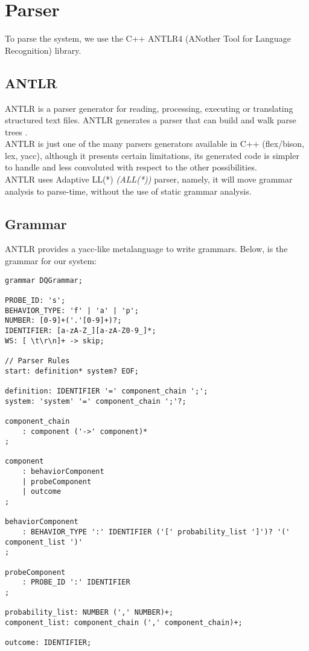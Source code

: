 \section{Parser}
        To parse the system, we use the C++ ANTLR4 (ANother Tool for Language Recognition) library. 
        \subsection{ANTLR}
    ANTLR is a parser generator for reading, processing, executing or translating structured text files. ANTLR generates a parser that can build and walk parse trees \cite{antlr4}. \\
 ANTLR is just one of the many parsers generators available in C++ (flex/bison, lex, yacc), although it presents certain limitations, its generated code is simpler to handle and less convoluted with respect to the other possibilities. \\
        ANTLR uses Adaptive LL(*) \textit{(ALL(*))} parser, namely, it will move grammar analysis to parse-time, without the use of static grammar analysis. \cite{antlr}

        \subsection{Grammar}
            ANTLR provides a yacc-like metalanguage \cite{antlr} to write grammars. Below, is the grammar for our system:
            \begin{verbatim} 
grammar DQGrammar;

PROBE_ID: 's';
BEHAVIOR_TYPE: 'f' | 'a' | 'p';
NUMBER: [0-9]+('.'[0-9]+)?;
IDENTIFIER: [a-zA-Z_][a-zA-Z0-9_]*;
WS: [ \t\r\n]+ -> skip;

// Parser Rules
start: definition* system? EOF;

definition: IDENTIFIER '=' component_chain ';';
system: 'system' '=' component_chain ';'?;

component_chain
    : component ('->' component)*
;

component
    : behaviorComponent
    | probeComponent
    | outcome
;

behaviorComponent
    : BEHAVIOR_TYPE ':' IDENTIFIER ('[' probability_list ']')? '(' component_list ')'
;

probeComponent
    : PROBE_ID ':' IDENTIFIER
;

probability_list: NUMBER (',' NUMBER)+;
component_list: component_chain (',' component_chain)+;

outcome: IDENTIFIER;
        \end{verbatim}
             
